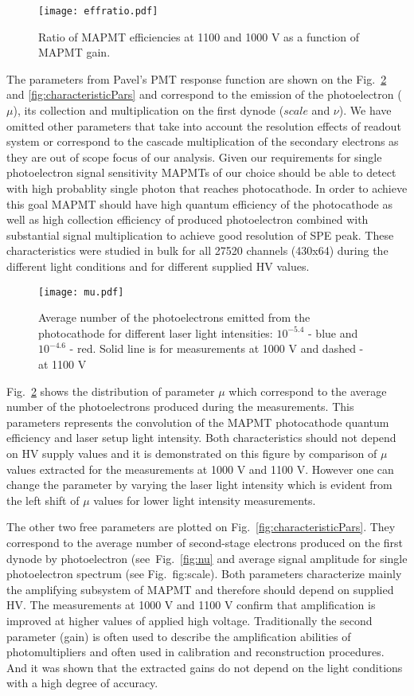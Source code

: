 \begin{figure}[bt]
	\centering
	\texttt{[image: effratio.pdf]}
	\caption{Ratio of MAPMT efficiencies at 1100 and 1000 V as a function of MAPMT gain.}
	\label{fig:effratio}
\end{figure}

The parameters from Pavel's PMT response function are shown on the Fig.~\ref{fig:mu} and \ref{fig:characteristicPars} and correspond to the emission of the photoelectron ($\mu$), its collection and multiplication on the first dynode ($scale$ and $\nu$).
We have omitted other parameters that take into account the resolution effects of readout system or correspond to the cascade multiplication of the secondary electrons as they are out of scope focus of our analysis.
Given our requirements for single photoelectron signal sensitivity MAPMTs of our choice should be able to detect with high probablity single photon that reaches photocathode.
In order to achieve this goal MAPMT should have high quantum efficiency of the photocathode as well as high collection efficiency of produced photoelectron combined with substantial signal multiplication to achieve good resolution of SPE peak.
These characteristics were studied in bulk for all 27520 channels (430x64) during the different light conditions and for different supplied HV values.

\begin{figure}[bt]
	\centering
	\texttt{[image: mu.pdf]}
	\caption{Average number of the photoelectrons emitted from the photocathode for different laser light intensities: $10^{-5.4}$ - blue and $10^{-4.6}$ - red. Solid line is for measurements at 1000 V and dashed - at 1100 V}
	\label{fig:mu}
\end{figure}

Fig.~\ref{fig:mu} shows the distribution of parameter $\mu$ which correspond to the average number of the photoelectrons produced during the measurements.
This parameters represents the convolution of the MAPMT photocathode quantum efficiency and laser setup light intensity.
Both characteristics should not depend on HV supply values and it is demonstrated on this figure by comparison of $\mu$ values extracted for the measurements at 1000 V and 1100 V.
However one can change the parameter by varying the laser light intensity which is evident from the left shift of $\mu$ values for lower light intensity measurements.

The other two free parameters are plotted on Fig.~\ref{fig:characteristicPars}.
They correspond to the average number of second-stage electrons produced on the first dynode by photoelectron (see~Fig.~\ref{fig:nu} and average signal amplitude for single photoelectron spectrum (see Fig.~{fig:scale}).
Both parameters characterize mainly the amplifying subsystem of MAPMT and therefore should depend on supplied HV.
The measurements at 1000 V and 1100 V confirm that amplification is improved at higher values of applied high voltage.
Traditionally the second parameter (gain) is often used to describe the amplification abilities of photomultipliers and often used in calibration and reconstruction procedures.
And it was shown that the extracted gains do not depend on the light conditions with a high degree of accuracy.

